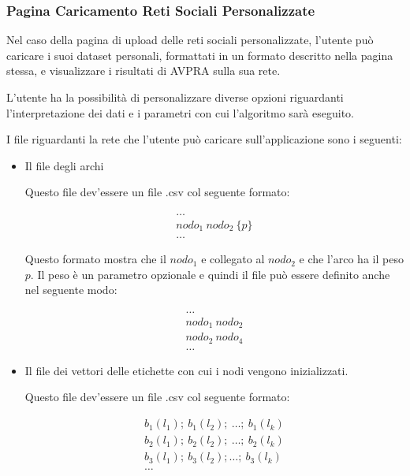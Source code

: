 \documentclass[a4paper,12pt]{report}
\begin{document}
			\subsubsection{Pagina Caricamento Reti Sociali Personalizzate}
			Nel caso della pagina di upload delle reti sociali personalizzate, l'utente può caricare i suoi dataset personali, formattati in un formato descritto nella pagina stessa, e visualizzare i risultati di AVPRA sulla sua rete. 

			L'utente ha la possibilità di personalizzare diverse opzioni riguardanti l'interpretazione dei dati e i parametri con cui l'algoritmo sarà eseguito. 

			I file riguardanti la rete che l'utente può caricare sull'applicazione sono i seguenti:

			\begin{itemize}
				\item Il file degli archi 
				
				Questo file dev'essere un file .csv col seguente formato: 

				\begin{equation}
				\begin{aligned}
				\dots \\
				nodo_1\ nodo_2\ \{ p \} \\
				\dots
				\end{aligned}
				\end{equation}

				Questo formato mostra che il $nodo_1$ e collegato al $nodo_2$ e che l'arco ha il peso $p$. Il peso è un parametro opzionale e quindi il file può essere definito anche nel seguente modo: 

				\begin{equation}
				\begin{aligned}
				\dots \\
				nodo_1\  nodo_2 \\
				nodo_2\  nodo_4 \\
				\dots
				\end{aligned}
				\end{equation}				

				\item Il file dei vettori delle etichette con cui i nodi vengono inizializzati. 

				Questo file dev'essere un file .csv col seguente formato: 

				\begin{equation}
				\begin{aligned}
				b_1(l_1);\ b_1(l_2);\ \dots;\ b_1(l_k) \\
				b_2(l_1);\ b_2(l_2);\ \dots;\ b_2(l_k) \\
				b_3(l_1);\ b_3(l_2); \dots;\ b_3(l_k) \\
				\dots
				\end{aligned}
				\end{equation}
				

\end{itemize}
\end{document}
